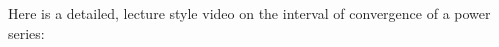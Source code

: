 \documentclass{ximera}
\begin{document}
\begin{center}
\begin{foldable}
\end{foldable}
\end{center}

\begin{center}
\begin{foldable}
Here is a detailed, lecture style video on the interval of convergence of a power series:
\end{foldable}
\end{center}
\end{document}
